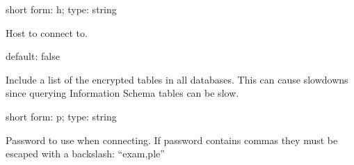 \documentclass[letterpaper,10pt,english]{sphinxmanual}
\begin{document}
\begin{fulllineitems}
\label{\detokenize{mariadb-database-summary:cmdoption-mariadb-database-summary-host}}
\sphinxAtStartPar
short form: \sphinxhyphen{}h; type: string

\sphinxAtStartPar
Host to connect to.

\end{fulllineitems}


\begin{fulllineitems}
\label{\detokenize{mariadb-database-summary:cmdoption-mariadb-database-summary-list-encrypted-tables}}
\sphinxAtStartPar
default: false

\sphinxAtStartPar
Include a list of the encrypted tables in all databases. This can cause slowdowns since
querying Information Schema tables can be slow.

\end{fulllineitems}


\begin{fulllineitems}
\label{\detokenize{mariadb-database-summary:cmdoption-mariadb-database-summary-password}}
\sphinxAtStartPar
short form: \sphinxhyphen{}p; type: string

\sphinxAtStartPar
Password to use when connecting.
If password contains commas they must be escaped with a backslash: “exam,ple”

\end{fulllineitems}
\end{document}
